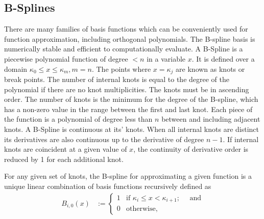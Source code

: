 \newpage

\subsection{B-Splines}


There are many families of basis functions which can be conveniently used for
function approximation, including orthogonal polynomials. The B-spline basis
\citep{DeBoor1972} is numerically stable and efficient to computationally
evaluate. A B-Spline is a piecewise polynomial function of degree $< n$ in a
variable $x$. It is defined over a domain $\kappa_0 \leq x \leq \kappa_m, m=n$.
The points where $x = \kappa_j$ are known as knots or break points. The number
of internal knots is equal to the degree of the polynomial if there are no knot
multiplicities. The knots must be in ascending order. The number of knots is
the minimum for the degree of the B-spline, which has a non-zero value in the
range between the first and last knot. Each piece of the function is a
polynomial of degree less than $n$ between and including adjacent knots. A B-Spline is
continuous at its' knots. When all internal knots are distinct its derivatives
are also continuous up to the derivative of degree $n - 1$. If internal knots
are coincident at a given value of $x$, the continuity of derivative order is
reduced by 1 for each additional knot.

For any given set of knots, the B-spline for approximating a given function is a
unique linear combination of basis functions recursively defined as
$$
\begin{array}{rl}
	B_{i, 0}(x) & := \begin{cases}                                                                                                        
	1           & \text{if } \kappa_i \leq x < \kappa_{i+1};  \quad \text{ and}                                                                                         \\
	0           & \text{otherwise,}                                                                                                        
	\end{cases}
\end{array}
$$

